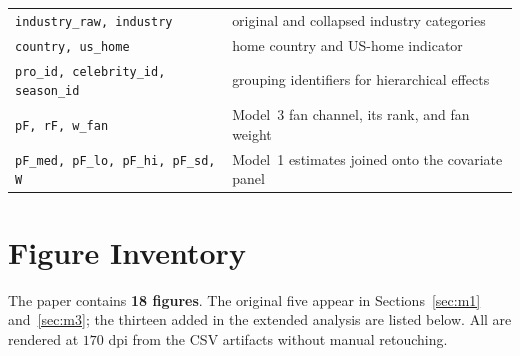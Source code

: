 \begin{table}[H]
\begin{tabular}{>{\raggedright\arraybackslash}p{3.3cm}>{\raggedright\arraybackslash}p{9.4cm}}
\midrule
\texttt{industry\_raw, industry} & original and collapsed industry categories \\
\texttt{country, us\_home} & home country and US-home indicator \\
\texttt{pro\_id, celebrity\_id, season\_id} & grouping identifiers for hierarchical effects \\
\texttt{pF, rF, w\_fan} & Model~3 fan channel, its rank, and fan weight \\
\texttt{pF\_med, pF\_lo, pF\_hi, pF\_sd, W} & Model~1 estimates joined onto the covariate panel \\
\bottomrule
\end{tabular}
\end{table}

\section{Figure Inventory}\label{app:figures}

The paper contains \textbf{18 figures}. The original five appear in Sections~\ref{sec:m1}
and~\ref{sec:m3}; the thirteen added in the extended analysis are listed below. All are
rendered at $170$ dpi from the CSV artifacts without manual retouching.

